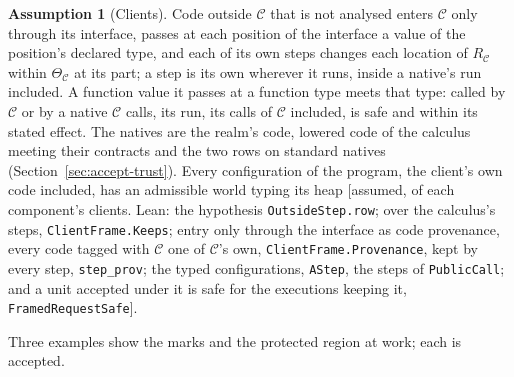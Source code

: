 \documentclass[10pt,a4paper]{article}
\theoremstyle{definition}
\newtheorem{assumption}[theorem]{Assumption}
\theoremstyle{remark}
\newcommand{\lean}[1]{\texttt{\small #1}}
\newcommand{\status}[1]{\textsf{\small[#1]}}
\newcommand{\cC}{\mathcal{C}}
\begin{document}
\begin{assumption}[Clients]\label{ass:clients}
Code outside $\cC$ that is not analysed enters $\cC$ only through its
interface, passes at each position of the interface a value of the
position's declared type, and each of its own steps changes each location
of $R_\cC$ within $\Theta_\cC$ at its part; a step is its own wherever it
runs, inside a native's run included. A function value it passes at a
function type meets that type: called by $\cC$ or by a native $\cC$ calls,
its run, its calls of $\cC$ included, is safe and within its stated
effect. The natives are the realm's code, lowered code of the calculus
meeting their contracts and the two rows on standard natives
(Section~\ref{sec:accept-trust}). Every configuration
of the program, the client's own code included, has an admissible world
typing its heap
\status{assumed, of each component's clients. Lean: the hypothesis \lean{OutsideStep.row}; over the calculus's steps, \lean{ClientFrame.Keeps}; entry only through the interface as code provenance, every code tagged with $\cC$ one of $\cC$'s own, \lean{ClientFrame.Provenance}, kept by every step, \lean{step\_prov}; the typed configurations, \lean{AStep}, the steps of \lean{PublicCall}; and a unit accepted under it is safe for the executions keeping it, \lean{FramedRequestSafe}}.
\end{assumption}

\noindent
Three examples show the marks and the protected region at work; each is
accepted.
\end{document}
